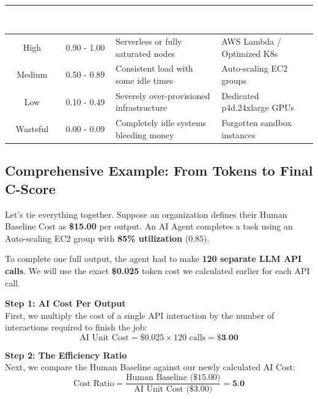 \documentclass[11pt,a4paper]{article}
\begin{document}
\begin{table}[H]
\centering
\renewcommand{\arraystretch}{1.5}
\small
{}
\begin{tabularx}{\textwidth}{| c | c | >{\raggedright\arraybackslash}X | >{\raggedright\arraybackslash}X |}
\hline
\rowcolor{dpiblue} \textcolor{white}{\textbf{Utilization}} & \textcolor{white}{\textbf{Multiplier}} & \textcolor{white}{\textbf{Description}} & \textcolor{white}{\textbf{Infrastructure Reality}} \\
\hline
High & 0.90 - 1.00 & Serverless or fully saturated nodes & AWS Lambda / Optimized K8s \\
Medium & 0.50 - 0.89 & Consistent load with some idle times & Auto-scaling EC2 groups \\
Low & 0.10 - 0.49 & Severely over-provisioned infrastructure & Dedicated p4d.24xlarge GPUs \\
Wasteful & 0.00 - 0.09 & Completely idle systems bleeding money & Forgotten sandbox instances \\
\hline
\end{tabularx}
\end{table}

\subsection{\textcolor{dpiteal}{Comprehensive Example: From Tokens to Final C-Score}}

Let's tie everything together. Suppose an organization defines their Human Baseline Cost as \textbf{\$15.00} per output. An AI Agent completes a task using an Auto-scaling EC2 group with \textbf{85\% utilization} ($0.85$). 

To complete one full output, the agent had to make \textbf{120 separate LLM API calls}. We will use the exact \textbf{\$0.025} token cost we calculated earlier for each API call.

\vspace{0.3cm}
\textbf{Step 1: AI Cost Per Output} \\
First, we multiply the cost of a single API interaction by the number of interactions required to finish the job:
\[ \text{AI Unit Cost} = \$0.025 \times 120 \text{ calls} = \textbf{\$3.00} \]

\vspace{0.3cm}
\textbf{Step 2: The Efficiency Ratio} \\
Next, we compare the Human Baseline against our newly calculated AI Cost:
\[ \text{Cost Ratio} = \frac{\text{Human Baseline (\$15.00)}}{\text{AI Unit Cost (\$3.00)}} = \textbf{5.0} \]
\end{document}
